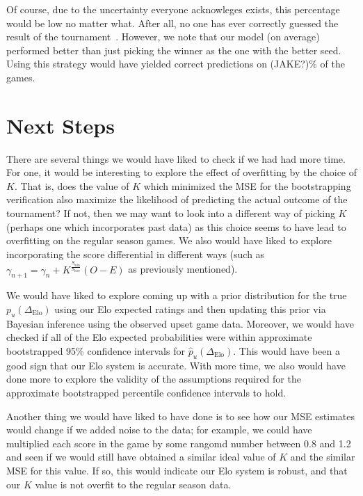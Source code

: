 \documentclass{article}
\begin{document}
Of course, due to the uncertainty everyone acknowleges exists, this percentage would be low no matter what. After all, no one has ever correctly guessed the result of the tournament~\cite{cbsnewsAnyoneEver}. However, we note that our model (on average) performed better than just picking the winner as the one with the better seed. Using this strategy would have yielded correct predictions on (JAKE?)\% of the games.



\section{Next Steps}\label{nextSteps}
There are several things we would have liked to check if we had had more time. For one, it would be interesting to explore the effect of overfitting by the choice of $K$. That is, does the value of $K$ which minimized the MSE for the bootstrapping verification also maximize the likelihood of predicting the actual outcome of the tournament? If not, then we may want to look into a different way of picking $K$ (perhaps one which incorporates past data) as this choice seems to have lead to overfitting on the regular season games. We also would have liked to explore incorporating the score differential in different ways (such as $\gamma_{n+1} = \gamma_n + K^{\frac{S_{\text{win}}}{S_{\text{lose}}}}(O - E)$ as previously mentioned).

We would have liked to explore coming up with a prior distribution for the true ${p}_u(\Delta_{\text{Elo}})$ using our Elo expected ratings and then updating this prior via Bayesian inference using the observed upset game data. Moreover, we would have checked if all of the Elo expected probabilities were within approximate bootstrapped 95\% confidence intervals for $\hat{p}_u(\Delta_{\text{Elo}})$. This would have been a good sign that our Elo system is accurate. With more time, we also would have done more to explore the validity of the assumptions required for the approximate bootstrapped percentile confidence intervals to hold.

Another thing we would have liked to have done is to see how our MSE estimates would change if we added noise to the data; for example, we could have multiplied each score in the game by some rangomd number between 0.8 and 1.2 and seen if we would still have obtained a similar ideal value of $K$ and the similar MSE for this value. If so, this would indicate our Elo system is robust, and that our $K$ value is not overfit to the regular season data.
\end{document}
